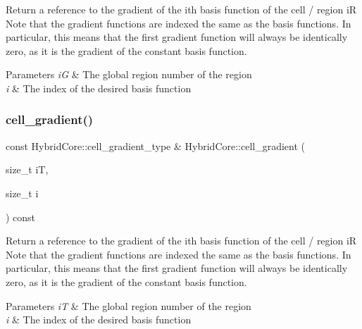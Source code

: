 Return a reference to the gradient of the i\textquotesingle{}th basis function of the cell / region iR Note that the gradient functions are indexed the same as the basis functions. In particular, this means that the first gradient function will always be identically zero, as it is the gradient of the constant basis function. 
\begin{DoxyParams}{Parameters}
{\em iG} & The global region number of the region \\
\hline
{\em i} & The index of the desired basis function \\
\hline
\end{DoxyParams}
\mbox{\label{classMeshFramework2D_1_1HybridCore_a710fc23b914623b90a2699ab4291e539}} 
\subsubsection{\texorpdfstring{cell\+\_\+gradient()}{cell\_gradient()}\hspace{0.1cm}{\footnotesize\ttfamily [2/2]}}
{\footnotesize\ttfamily const Hybrid\+Core\+::cell\+\_\+gradient\+\_\+type \& Hybrid\+Core\+::cell\+\_\+gradient (\begin{DoxyParamCaption}\item[{size\+\_\+t}]{iT,  }\item[{size\+\_\+t}]{i }\end{DoxyParamCaption}) const}

Return a reference to the gradient of the i\textquotesingle{}th basis function of the cell / region iR Note that the gradient functions are indexed the same as the basis functions. In particular, this means that the first gradient function will always be identically zero, as it is the gradient of the constant basis function. 
\begin{DoxyParams}{Parameters}
{\em iT} & The global region number of the region \\
\hline
{\em i} & The index of the desired basis function \\
\hline
\end{DoxyParams}
\mbox{\label{classMeshFramework2D_1_1HybridCore_ad6facc0f763dc9662918a072c2b2cf2d}} 
